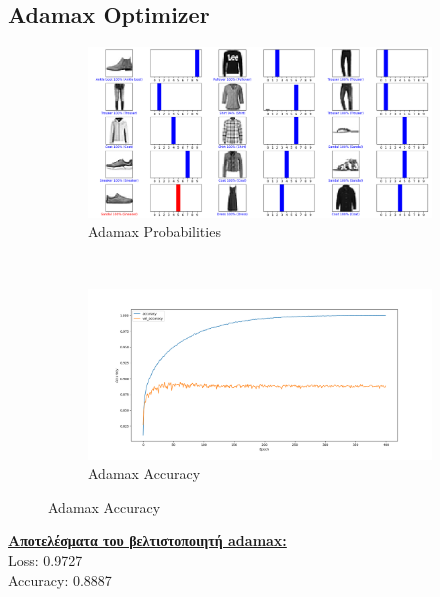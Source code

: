 \documentclass{article}
\begin{document}
\subsection*{Adamax Optimizer}
	\begin{figure}[h!]
		\centering
		\begin{subfigure}[t]{0.5\textwidth}
			\centering
			\includegraphics[width=\linewidth]{../exercise3_3/images/fashion_adamax_probabilities.png}
			\caption{Adamax Probabilities}
		\end{subfigure}%
		~
		\begin{subfigure}[t]{0.5\textwidth}
			\centering
			\includegraphics[width=\linewidth]{../exercise3_3/images/fashion_adamax_accuracy.png}
			\caption{Adamax Accuracy}
		\end{subfigure}
	\end{figure}
	\noindent
	\textbf{\underline{Aποτελέσματα του βελτιστοποιητή adamax:}}\\
	Loss: 0.9727 \\
	Accuracy: 0.8887
\end{document}
